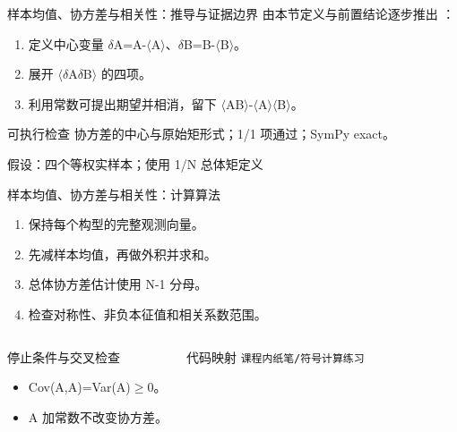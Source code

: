 \begin{frame}[t]{样本均值、协方差与相关性：推导与证据边界}
\footnotesize
{}\quad 由本节定义与前置结论逐步推出 ：
\begin{enumerate}
\item 定义中心变量 \ensuremath{\delta}A=A-\ensuremath{\langle}A\ensuremath{\rangle}、\ensuremath{\delta}B=B-\ensuremath{\langle}B\ensuremath{\rangle}。
\item 展开 \ensuremath{\langle}\ensuremath{\delta}A\ensuremath{\delta}B\ensuremath{\rangle} 的四项。
\item 利用常数可提出期望并相消，留下 \ensuremath{\langle}AB\ensuremath{\rangle}-\ensuremath{\langle}A\ensuremath{\rangle}\ensuremath{\langle}B\ensuremath{\rangle}。
\end{enumerate}\begin{block}{可执行检查}
\quad 协方差的中心与原始矩形式；1/1 项通过；SymPy exact。
\par\scriptsize 假设：四个等权实样本；使用 1/\allowbreak{}N 总体矩定义
\end{block}
\end{frame}

\begin{frame}[t]{样本均值、协方差与相关性：计算算法}
\footnotesize
{}\begin{enumerate}
\item 保持每个构型的完整观测向量。
\item 先减样本均值，再做外积并求和。
\item 总体协方差估计使用 N-1 分母。
\item 检查对称性、非负本征值和相关系数范围。
\end{enumerate}\begin{columns}[T,onlytextwidth]
\begin{block}{停止条件与交叉检查}\scriptsize\begin{itemize}
\item[\CheckMark] Cov(A,A)=Var(A)\ensuremath{\ge}0。
\item[\CheckMark] A 加常数不改变协方差。
\end{itemize}\end{block}
\begin{block}{代码映射}
\scriptsize \texttt{课程内纸笔/\allowbreak{}符号计算练习}
\end{block}\end{columns}\end{frame}

